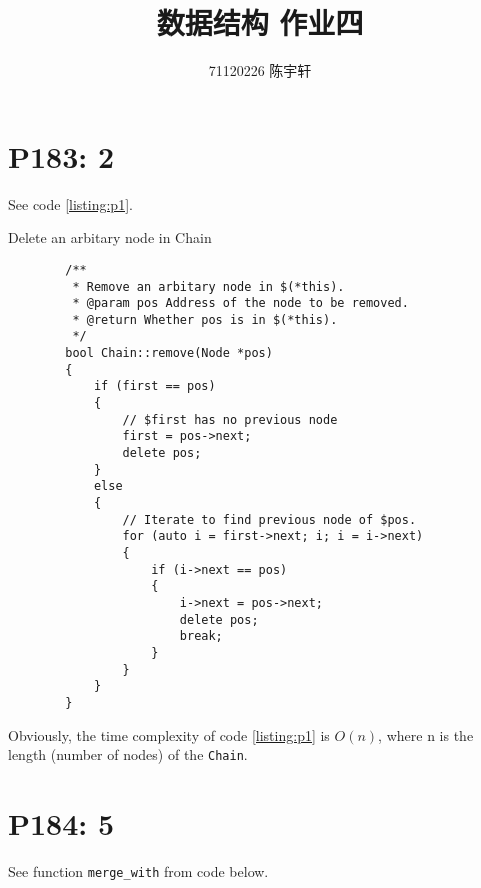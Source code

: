 \documentclass{report}
\author{71120226 陈宇轩}
\title{数据结构 作业四}
\begin{document}
    \maketitle

    \tableofcontents

    \chapter{P183: 2}

    See code \ref{listing:p1}.
    
    \begin{listing}[h]
        \caption{Delete an arbitary node in Chain}
        \label{listing:p1}
        \begin{verbatim}
        /**
         * Remove an arbitary node in $(*this).
         * @param pos Address of the node to be removed.
         * @return Whether pos is in $(*this).
         */
        bool Chain::remove(Node *pos)
        {
            if (first == pos)
            {
                // $first has no previous node
                first = pos->next;
                delete pos;
            }
            else
            {
                // Iterate to find previous node of $pos.
                for (auto i = first->next; i; i = i->next)
                {
                    if (i->next == pos)
                    {
                        i->next = pos->next;
                        delete pos;
                        break;
                    }
                }
            }
        }
        \end{verbatim}
    \end{listing}

    Obviously, the time complexity of code \ref{listing:p1} is $O(n)$,
    where n is the length (number of nodes) of the \verb|Chain|. 

    \chapter{P184: 5}

    See function \verb|merge_with| from code below.
\end{document}
